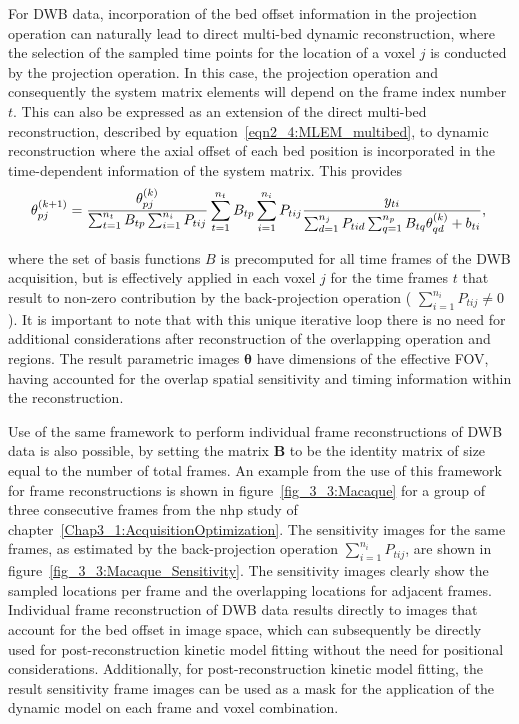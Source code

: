 For DWB data, incorporation of the bed offset information in the projection operation can naturally lead to direct multi-bed dynamic reconstruction, where the selection of the sampled time points for the location of a voxel $j$ is conducted by the projection operation. In this case, the projection operation and consequently the system matrix elements will depend on the frame index number $t$. 
This can also be expressed as an extension of the direct multi-bed reconstruction, described by equation~\ref{eqn2_4:MLEM_multibed}, to dynamic reconstruction where the axial offset of each bed position is incorporated in the time-dependent information of the system matrix.
This provides
%
\begin{equation}
\theta_{pj}^{(k+1)} = \frac{\theta_{pj}^{(k)}}
{\sum_{t=1}^{n_t} B_{tp} \sum_{i=1}^{n_i} P_{tij}} 
\sum_{t=1}^{n_t} B_{tp}  \sum_{i=1}^{n_i} P_{tij} 
\frac{y_{ti}}
{\sum_{d=1}^{n_j} P_{tid} \sum_{q=1}^{n_p} B_{tq}\theta_{qd}^{(k)} + b_{ti} } \\, \\
\label{eqn:4DMLEM_Multibed}
\end{equation} 

where the set of basis functions $B$ is precomputed for all time frames of the DWB acquisition, but is effectively applied in each voxel $j$ for the time frames $t$ that result to non-zero contribution by the back-projection operation ( $\sum_{i=1}^{n_i} P_{tij} \neq 0$).
It is important to note that with this unique iterative loop there is no need for additional considerations after reconstruction of the overlapping operation and regions. The result parametric images $\boldsymbol\theta$ have dimensions of the effective FOV, having accounted for the overlap spatial sensitivity and timing information within the reconstruction.

Use of the same framework to perform individual frame reconstructions of DWB data is also possible, by setting the matrix $\boldsymbol{B}$ to be the identity matrix of size equal to the number of total frames. 
An example from the use of this framework for frame reconstructions is shown in figure~\ref{fig_3_3:Macaque} for a group of three consecutive frames from the \gls{nhp} study of chapter~\ref{Chap3_1:AcquisitionOptimization}. The sensitivity images for the same frames, as estimated by the back-projection operation $\sum_{i=1}^{n_i} P_{tij}$, are shown in figure~\ref{fig_3_3:Macaque_Sensitivity}.
The sensitivity images clearly show the sampled locations per frame and the overlapping locations for adjacent frames. 
Individual frame reconstruction of DWB data results directly to images that account for the bed offset in image space, which can subsequently be directly used for post-reconstruction kinetic model fitting without the need for positional considerations. 
Additionally, for post-reconstruction kinetic model fitting, the result sensitivity frame images can be used as a mask for the application of the dynamic model on each frame and voxel combination.

